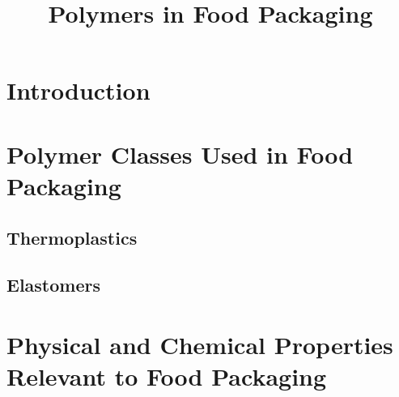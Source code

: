 \documentclass[11pt,a4paper]{article}
\title{Polymers in Food Packaging}
\date{}
\begin{document}
\maketitle

\section{Introduction}

\section{Polymer Classes Used in Food Packaging}

\subsection{Thermoplastics}

\subsection{Elastomers}

\section{Physical and Chemical Properties Relevant to Food Packaging}
\end{document}
